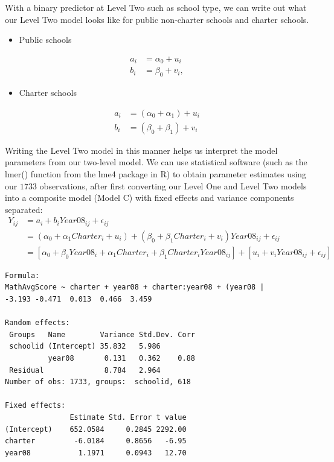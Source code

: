\documentclass[
]{krantz}
\providecommand{\tightlist}{%
  \setlength{\itemsep}{0pt}\setlength{\parskip}{0pt}}
\begin{document}
With a binary predictor at Level Two such as school type, we can write out what our Level Two model looks like for public non-charter schools and charter schools.

\begin{itemize}
\tightlist
\item
  Public schools
\end{itemize}

\begin{align*}
a_{i} & = \alpha_{0} + u_{i}\\
b_{i} & = \beta_{0} + v_{i},
\end{align*}

\begin{itemize}
\tightlist
\item
  Charter schools
\end{itemize}

\begin{align*}
a_{i} & = (\alpha_{0} + \alpha_{1}) + u_{i}\\
b_{i} & = (\beta_{0}+ \beta_{1}) + v_{i}
\end{align*}

Writing the Level Two model in this manner helps us interpret the model parameters from our two-level model. We can use statistical software (such as the lmer() function from the lme4 package in R) to obtain parameter estimates using our \(1733\) observations, after first converting our Level One and Level Two models into a composite model (Model C) with fixed effects and variance components separated:
\begin{align*}
Y_{ij} & = a_{i} + b_{i}Year08_{ij}+ \epsilon_{ij} \\
       & = (\alpha_{0} + \alpha_{1}Charter_i +u_{i}) + (\beta_{0} + \beta_{1}Charter_i + v_{i})Year08_{ij} + \epsilon_{ij} \\
       & = [\alpha_{0} + \beta_{0}Year08_i +\alpha_{1}Charter_i+ \beta_{1}Charter_iYear08_{ij}] + [u_{i} + v_{i}Year08_{ij} + \epsilon_{ij}]
\end{align*}

\begin{verbatim}
Formula: 
MathAvgScore ~ charter + year08 + charter:year08 + (year08 |  
-3.193 -0.471  0.013  0.466  3.459 

Random effects:
 Groups   Name        Variance Std.Dev. Corr
 schoolid (Intercept) 35.832   5.986        
          year08       0.131   0.362    0.88
 Residual              8.784   2.964        
Number of obs: 1733, groups:  schoolid, 618

Fixed effects:
               Estimate Std. Error t value
(Intercept)    652.0584     0.2845 2292.00
charter         -6.0184     0.8656   -6.95
year08           1.1971     0.0943   12.70
\end{verbatim}
\end{document}
